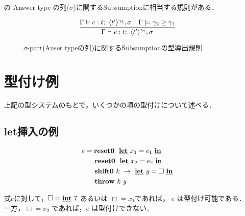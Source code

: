 \Shiftz の Answer type の列($\sigma$)に関するSubsumptionに相当する規則がある．

\begin{figure}[H]
  \centering
  \[
    \infer
    {\Gamma \vdash e : t;~\codeT{t'}{\gamma_2},\sigma}
    {\Gamma \vdash e : t;~\codeT{t'}{\gamma_1},\sigma
      & \Gamma \models \gamma_2 \ord \gamma_1
    }
  \]
  \caption{$\sigma$-part(Anser typeの列)に関するSubsumptionの型導出規則}
  \label{fig:sigma_subs_type_rule}
\end{figure}
\hrulefill
\section{型付け例}

上記の型システムのもとで，いくつかの項の型付けについて述べる．

\subsection{let挿入の例}
\label{subsec:exam-let}


\begin{align*}
  e & = \textbf{reset0} ~~\underline{\textbf{let}}~x_1= e_1 ~\underline{\textbf{in}} \\
    & \phantom{=}~~ \textbf{reset0} ~~\underline{\textbf{let}}~x_2= e_2~\underline{\textbf{in}} \\
    & \phantom{=}~~ \textbf{shift0}~k~\to~\underline{\textbf{let}}~y=\Box~\underline{\textbf{in}} \\
    & \phantom{=}~~ \textbf{throw}~ k~ y
\end{align*}

式$e$に対して，$\Box=\underline{\textbf{int}}~ 7$ あるいは $\Box=x_1$であれば，
$e$ は型付け可能である．
一方，$\Box=x_2$ であれば，$e$ は型付けできない．

\newcommand\tzero{\codeT{t}{\gamma_0}}
\newcommand\tone{\codeT{t}{\gamma_1}}
\newcommand\ttwo{\codeT{t}{\gamma_2}}
\newcommand\tthree{\codeT{t}{\gamma_3}}
\newcommand\tonethree{\codeT{t}{\gamma_1\uni\gamma_3}}
\newcommand\tall{\codeT{t}{\gamma_2\uni\gamma_1\uni\gamma_3}}
\newcommand\Gammaone{
  \longer{\gamma_1}{\gamma_0},~x_1:\tone \vdash
  \cLet~x_2=e_2~\cIn~\cdots : \tone;~\tone,\tzero}
\newcommand\Gammatwo{
  \Gamma_1,~k_2:\contT{\ttwo}{\tone}{\tzero},
  ~k_1:\contT{\tone}{\tzero}{\cdot{}}}

\def\proofone{
  \infer
  {\vdash e:\tzero;~\cdot{}}
  {
    \infer{\vdash \cLet~x_1=e_1~\cIn~\Resetz~\cLet~x_2=e_2~\cIn~\cdots :
      \tzero;~\tzero
    }
    {\infer{\longer{\gamma_1}{\gamma_0},~x_1:\tone \vdash
        \Resetz~\cLet~x_2=e_2~\cIn~\cdots : \tone;~\tzero
      }
      {\prooftwo}
    }
  }
}
\def\prooftwo{
  \infer{\longer{\gamma_1}{\gamma_0},~x_1:\tone \vdash
    \cLet~x_2=e_2~\cIn~\cdots : \tone;~\tone,\tzero}
  {\infer{\Gamma_1=\longer{\gamma_2}{\gamma_1},~x_2:\ttwo,~\longer{\gamma_1}{\gamma_0},~x_1:\tone \vdash
      \shiftz{k}{\cdots} : \ttwo;~\tone,\tzero
    }
    {\proofthree}
  }
}


